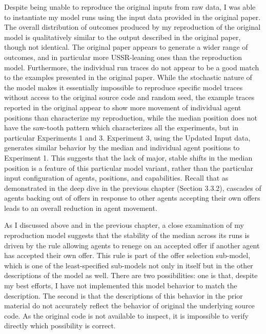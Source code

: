 Despite being unable to reproduce the original inputs from raw data, I was able to instantiate my model runs using the input data provided in the original paper. The overall distribution of outcomes produced by my reproduction of the original model is qualitatively similar to the output described in the original paper, though not identical. The original paper appears to generate a wider range of outcomes, and in particular more USSR-leaning ones than the reproduction model. Furthermore, the individual run traces do not appear to be a good match to the examples presented in the original paper. While the stochastic nature of the model makes it essentially impossible to reproduce specific model traces without access to the original source code and random seed, the example traces reported in the original appear to show more movement of individual agent positions than characterize my reproduction, while the median position does not have the saw-tooth pattern which characterizes all the experiments, but in particular Experiments 1 and 3. 
Experiment 3, using the Updated Input data, generates similar behavior by the median and individual agent positions to Experiment 1. This suggests that the lack of major, stable shifts in the median position is a feature of this particular model variant, rather than the particular input configuration of agents, positions, and capabilities. Recall that as demonstrated in the deep dive in the previous chapter (Section 3.3.2), cascades of agents backing out of offers in response to other agents accepting their own offers leads to an overall reduction in agent movement.

As I discussed above and in the previous chapter, a close examination of my reproduction model suggests that the stability of the median across its runs is driven by the rule allowing agents to renege on an accepted offer if another agent has accepted their own offer. This rule is part of the offer selection sub-model, which is one of the least-specified sub-models not only in \citet{bdm_1998} itself but in the other descriptions of the model as well. There are two possibilities: one is that, despite my best efforts, I have not implemented this model behavior to match the description. The second is that the descriptions of this behavior in the prior material do not accurately reflect the behavior of original the underlying source code. As the original code is not available to inspect, it is impossible to verify directly which possibility is correct. 

